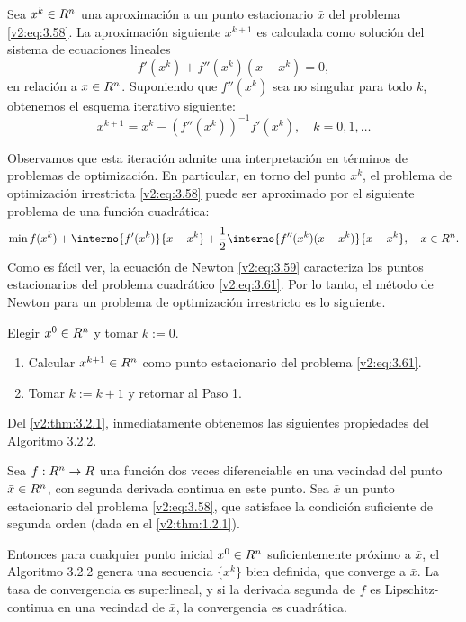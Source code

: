 Sea $x^k \in R^n$ una aproximación a un punto estacionario $\bar{x}$ del problema \eqref{v2:eq:3.58}. La aproximación siguiente $x^{k+1}$ es calculada como solución del sistema de ecuaciones lineales
\begin{equation}
    f'(x^k) + f''(x^k)(x - x^k) = 0,
    \label{v2:eq:3.59}
\end{equation}
en relación a $x \in R^n$. Suponiendo que $f''(x^k)$ sea no singular para todo $k$, obtenemos el esquema iterativo siguiente:
\begin{equation}
    x^{k+1} = x^k - (f''(x^k))^{-1}f'(x^k), \quad k = 0, 1, \dots
    \label{v2:eq:3.60}
\end{equation}

Observamos que esta iteración admite una interpretación en términos de problemas de optimización. En particular, en torno del punto $x^k$, el problema de optimización irrestricta \eqref{v2:eq:3.58} puede ser aproximado por el siguiente problema de una función cuadrática:
\begin{equation}
    \min f(x^k) + \interno{f'(x^k)}{x - x^k} + \frac{1}{2}\interno{f''(x^k)(x - x^k)}{x - x^k}, \quad x \in \Rn.
    \label{v2:eq:3.61}
\end{equation}
Como es fácil ver, la ecuación de Newton \eqref{v2:eq:3.59} caracteriza los puntos estacionarios del problema cuadrático \eqref{v2:eq:3.61}. Por lo tanto, el método de Newton para un problema de optimización irrestricto es lo siguiente.

\begin{algorithm}
Elegir $x^0 \in R^n$ y tomar $k:=0$.
\begin{enumerate}
    \item Calcular $x^{k+1} \in R^n$ como punto estacionario del problema \eqref{v2:eq:3.61}.
    \item Tomar $k := k + 1$ y retornar al Paso 1.
\end{enumerate}
\end{algorithm}

Del \cref{v2:thm:3.2.1}, inmediatamente obtenemos las siguientes propiedades del Algoritmo 3.2.2.

\begin{corollary}\label{v2:cor:3.2.2}
    Sea $f : R^n \to R$ una función dos veces diferenciable en una vecindad del punto $\bar{x} \in R^n$, con segunda derivada continua en este punto. Sea $\bar{x}$ un punto estacionario del problema \eqref{v2:eq:3.58}, que satisface la condición suficiente de segunda orden (dada en el \cref{v2:thm:1.2.1}).
    
    Entonces para cualquier punto inicial $x^0 \in R^n$ suficientemente próximo a $\bar{x}$, el Algoritmo 3.2.2 genera una secuencia $\{x^k\}$ bien definida, que converge a $\bar{x}$. La tasa de convergencia es superlineal, y si la derivada segunda de $f$ es Lipschitz-continua en una vecindad de $\bar{x}$, la convergencia es cuadrática.
\end{corollary}

